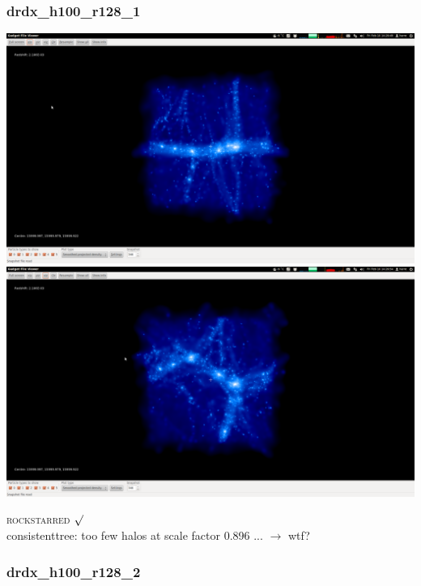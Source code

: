 \documentclass[a4paper,11pt,fleqn,oneside]{book}
\begin{document}
\newpage
\subsubsection{drdx\_h100\_r128\_1}

\includegraphics[scale=0.12]{drdx_h100_r128_1/1.png} 
\includegraphics[scale=0.12]{drdx_h100_r128_1/2.png} 

\textsc{rockstarred} $\surd$  \\
consistenttree: too few halos at scale factor 0.896 ... $\rightarrow$ wtf? 

\newpage
\subsubsection{drdx\_h100\_r128\_2}
\end{document}
